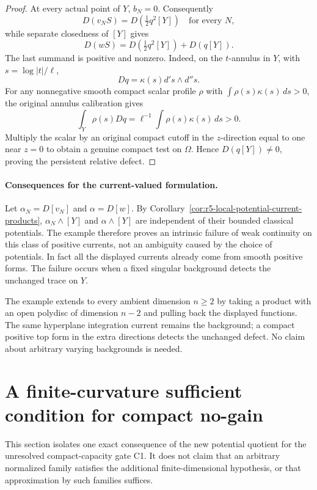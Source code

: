\documentclass[11pt,a4paper]{article}
\numberwithin{equation}{section}
\theoremstyle{definition}
\theoremstyle{remark}
\begin{document}
\begin{proof}
At every actual point of $Y$, $b_N=0$. Consequently
\[
  D(v_NS)=D\!\left(\tfrac12q^2[Y]\right)
                      \quad\text{for every }N,
\]
while separate closedness of $[Y]$ gives
\[
 D(wS)=D\!\left(\tfrac12q^2[Y]\right)+D(q[Y]).
\]
The last summand is positive and nonzero. Indeed, on the
$t$-annulus in $Y$, with $s=\log|t|/\ell$,
\[
                     Dq=\kappa(s)d's\wedge d''s.
\]
For any nonnegative smooth compact scalar profile $\rho$
with $\int\rho(s)\kappa(s)\,ds>0$, the original annulus
calibration gives
\[
       \int_Y\rho(s)Dq
             =\ell^{-1}\int\rho(s)\kappa(s)\,ds>0.
\]
Multiply the scalar by an original compact cutoff in the
$z$-direction equal to one near $z=0$ to obtain a genuine
compact test on $\Omega$. Hence $D(q[Y])\ne0$, proving
the persistent relative defect.
\end{proof}

\paragraph{Consequences for the current-valued formulation.}
Let $\alpha_N=D[v_N]$ and $\alpha=D[w]$. By
Corollary~\ref{cor:r5-local-potential-current-products},
$\alpha_N\wedge[Y]$ and $\alpha\wedge[Y]$ are independent
of their bounded classical potentials. The example therefore
proves an intrinsic failure of weak continuity on this class
of positive currents, not an ambiguity caused by the choice
of potentials. In fact all the displayed currents already
come from smooth positive forms. The failure occurs when a
fixed singular background detects the unchanged trace on $Y$.

The example extends to every ambient dimension $n\geq2$
by taking a product with an open polydisc of dimension $n-2$
and pulling back the displayed functions. The same
hyperplane integration current remains the background; a
compact positive top form in the extra directions detects
the unchanged defect. No claim about arbitrary varying
backgrounds is needed.




\section{A finite-curvature sufficient condition for compact no-gain}
\label{sec:r5-compact-capacity-finite-curvature}

This section isolates one exact consequence of the new potential
quotient for the unresolved compact-capacity gate C1.  It does not
claim that an arbitrary normalized family satisfies the additional
finite-dimensional hypothesis, or that approximation by such
families suffices.
\end{document}
